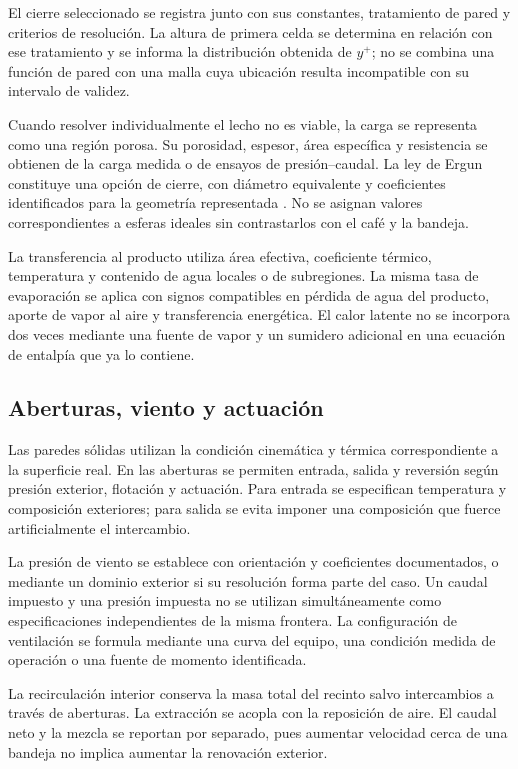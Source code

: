 El cierre seleccionado se registra junto con sus constantes, tratamiento de pared y criterios de resolución. La altura de primera celda se determina en relación con ese tratamiento y se informa la distribución obtenida de $y^+$; no se combina una función de pared con una malla cuya ubicación resulta incompatible con su intervalo de validez.

Cuando resolver individualmente el lecho no es viable, la carga se representa como una región porosa. Su porosidad, espesor, área específica y resistencia se obtienen de la carga medida o de ensayos de presión--caudal. La ley de Ergun constituye una opción de cierre, con diámetro equivalente y coeficientes identificados para la geometría representada \cite{ergun1952}. No se asignan valores correspondientes a esferas ideales sin contrastarlos con el café y la bandeja.

La transferencia al producto utiliza área efectiva, coeficiente térmico, temperatura y contenido de agua locales o de subregiones. La misma tasa de evaporación se aplica con signos compatibles en pérdida de agua del producto, aporte de vapor al aire y transferencia energética. El calor latente no se incorpora dos veces mediante una fuente de vapor y un sumidero adicional en una ecuación de entalpía que ya lo contiene.

\subsection{Aberturas, viento y actuación}

Las paredes sólidas utilizan la condición cinemática y térmica correspondiente a la superficie real. En las aberturas se permiten entrada, salida y reversión según presión exterior, flotación y actuación. Para entrada se especifican temperatura y composición exteriores; para salida se evita imponer una composición que fuerce artificialmente el intercambio.

La presión de viento se establece con orientación y coeficientes documentados, o mediante un dominio exterior si su resolución forma parte del caso. Un caudal impuesto y una presión impuesta no se utilizan simultáneamente como especificaciones independientes de la misma frontera. La configuración de ventilación se formula mediante una curva del equipo, una condición medida de operación o una fuente de momento identificada.

La recirculación interior conserva la masa total del recinto salvo intercambios a través de aberturas. La extracción se acopla con la reposición de aire. El caudal neto y la mezcla se reportan por separado, pues aumentar velocidad cerca de una bandeja no implica aumentar la renovación exterior.

